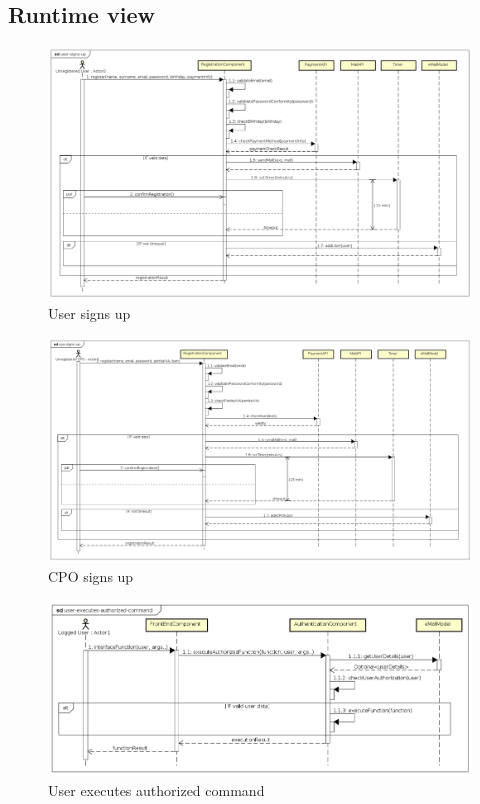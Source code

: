 \subsection{Runtime view}
\begin{figure}[!h]
    \begin{center}
        \includegraphics[keepaspectratio, width=16cm]{Sequence/user-signs-up.png}
        \caption{User signs up}
        \label{fig:user-signs-up}
    \end{center}
\end{figure}
\begin{figure}[!h]
    \begin{center}
        \includegraphics[keepaspectratio, width=16cm]{Sequence/cpo-signs-up.png}
        \caption{\ac{CPO} signs up}
        \label{fig:cpo-signs-up}
    \end{center}
\end{figure}
\begin{figure}[!h]
    \begin{center}
        \includegraphics[keepaspectratio, width=16cm]{Sequence/user-executes-authorized-command.png}
        \caption{User executes authorized command}
        \label{fig:user-executes-authorized-command}
    \end{center}
\end{figure}
